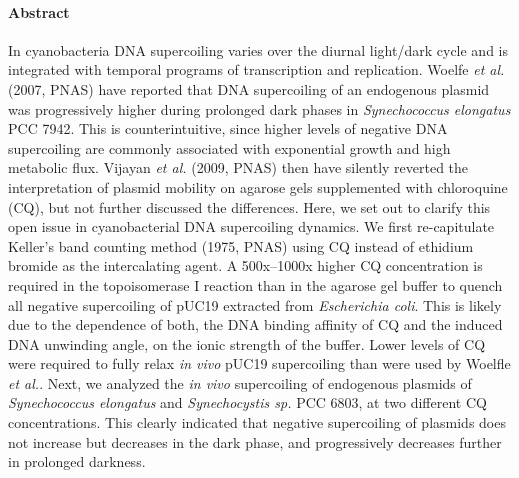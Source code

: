 \documentclass[10pt,a4]{article}
\begin{document}
\paragraph*{Abstract}
In cyanobacteria DNA supercoiling varies over the diurnal light/dark
cycle and is integrated with temporal programs of transcription and
replication. Woelfe \textit{et al.} (2007, PNAS) have reported that
DNA supercoiling of an endogenous plasmid was progressively higher
during prolonged dark phases in \textit{Synechococcus elongatus} PCC
7942.  This is counterintuitive, since higher levels of negative DNA
supercoiling are commonly associated with exponential growth and high
metabolic flux. Vijayan \textit{et al.} (2009, PNAS) then have
silently reverted the interpretation of plasmid mobility on agarose
gels supplemented with chloroquine (CQ), but not further discussed the
differences.
%
Here, we set out to clarify this open issue in cyanobacterial DNA
supercoiling dynamics. We first re-capitulate Keller's band counting
method (1975, PNAS) using CQ instead of ethidium bromide as the
intercalating agent.  A 500x--1000x higher CQ concentration is
required in the topoisomerase I reaction than in the agarose gel
buffer to quench all negative supercoiling of pUC19 extracted from
\textit{Escherichia coli}. This is likely due to the dependence of
both, the DNA binding affinity of CQ and the induced DNA unwinding
angle, on the ionic strength of the buffer. Lower levels of CQ were
required to fully relax \textit{in vivo} pUC19 supercoiling than were
used by Woelfle \textit{et al.}. Next, we analyzed the \textit{in vivo}
supercoiling of endogenous plasmids of \textit{Synechococcus
  elongatus} and \textit{Synechocystis sp.} PCC 6803, at two different
CQ concentrations.  This clearly indicated that negative supercoiling
of plasmids does not increase but decreases in the dark phase, and
progressively decreases further in prolonged darkness.




\linenumbers
\end{document}

